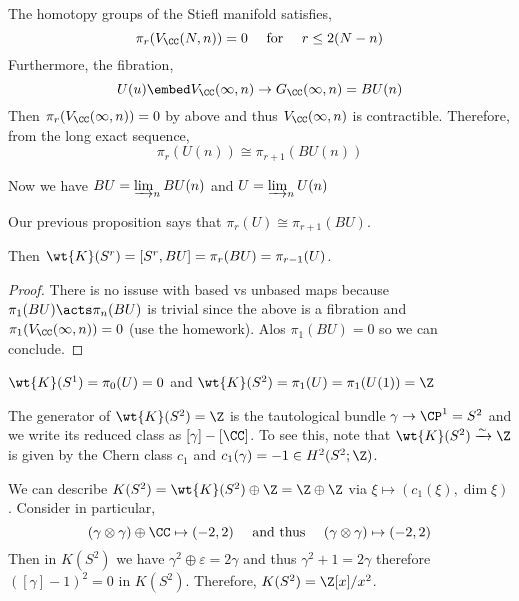 \documentclass[12pt]{extarticle}
\begin{document}
\begin{prop}
The homotopy groups of the Stiefl manifold satisfies,
\[ \pi_r(V_\CC(N, n)) = 0 \quad \text{ for } \quad r \le 2 (N - n) \]
Furthermore, the fibration,
\[ U(u) \embed V_\CC(\infty, n) \to G_\CC(\infty, n) = BU(n) \]
Then $\pi_r(V_\CC(\infty, n)) = 0$ by above and thus $V_\CC(\infty, n)$ is contractible. Therefore, from the long exact sequence,
\[ \pi_r(U(n)) \cong \pi_{r+1}(BU(n)) \]
\end{prop}

\begin{defn}
Now we have $BU = \varinjlim_n BU(n)$ and $U = \varinjlim_n U(n)$
\end{defn}

\begin{rmk}
Our previous proposition says that $\pi_r(U) \cong \pi_{r+1}(BU)$. 
\end{rmk}

\begin{prop}
Then $\wt{K}(S^r) = [S^r, BU] = \pi_r(BU) = \pi_{r-1}(U)$. 
\end{prop}

\begin{proof}
There is no issuse with based vs unbased maps because $\pi_1(BU) \acts \pi_n(BU)$ is trivial since the above is a fibration and $\pi_1(V_\CC(\infty, n)) = 0$ (use the homework). Alos $\pi_1(BU) = 0$ so we can conclude.
\end{proof}

\begin{example}
$\wt{K}(S^1) = \pi_0(U) = 0$ and $\wt{K}(S^2) = \pi_1(U) = \pi_1(U(1)) = \Z$ 
\end{example}

\begin{rmk}
The generator of $\wt{K}(S^2) = \Z$ is the tautological bundle $\gamma \to \CP^1 = S^2$ and we write its reduced class as $[\gamma] - [\CC]$. To see this, note that $\wt{K}(S^2) \xrightarrow{\sim} \Z$ is given by the Chern class $c_1$ and $c_1(\gamma) = -1 \in H^2(S^2; \Z)$.
\end{rmk}

\begin{rmk}
We can describe $K(S^2) = \wt{K}(S^2) \oplus \Z = \Z \oplus \Z$ via $\xi \mapsto (c_1(\xi), \dim{\xi})$. Consider in particular,
\[ (\gamma \otimes \gamma) \oplus \CC \mapsto (-2, 2) \quad \text{ and thus } \quad (\gamma \otimes \gamma) \mapsto (-2, 2) \]
Then in $K(S^2)$ we have $\gamma^2 \oplus \varepsilon = 2 \gamma$ and thus $\gamma^2 + 1 = 2 \gamma$ therefore $([\gamma] - 1)^2 = 0$ in $K(S^2)$. Therefore, $K(S^2) = \Z[x]/x^2$. 
\end{rmk}
\end{document}
